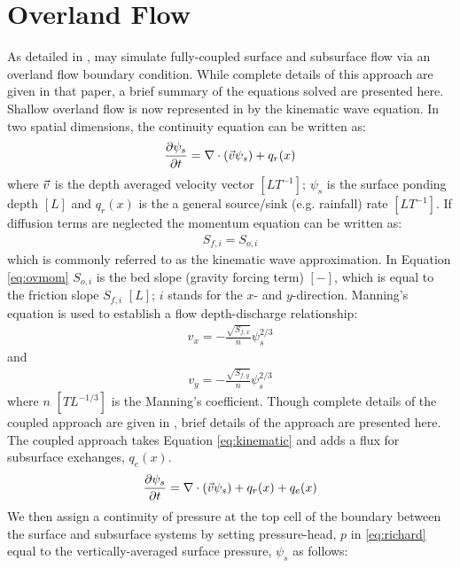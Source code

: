 \section{Overland Flow}
\label{Overland Flow}
As detailed in \cite{KM06}, \parflow{} may simulate fully-coupled surface and subsurface flow via an overland flow boundary condition.  While complete details of this approach are given in that paper, a brief summary of the equations solved are presented here.  Shallow overland flow is now represented in \parflow{} by the kinematic wave equation.   In two spatial dimensions, the continuity equation can be written as:
\begin{eqnarray}
\frac{\partial \psi_s}{\partial t} =
\nabla \cdot ({\vec v}\psi_s) + q_r(x)
\label{eq:kinematic}
\end{eqnarray}
where ${\vec v}$ is the depth averaged velocity vector $[LT^{-1}]$; $\psi_s$ is the surface ponding depth $[L]$ and $q_r(x)$ is the a general source/sink (e.g. rainfall) rate $[LT^{-1}]$. If diffusion terms are neglected the momentum equation can be written as:
\begin{eqnarray}
S_{f,i} = S_{o,i}
\label{eq:ovmom}
\end{eqnarray}
which is commonly referred to as the kinematic wave approximation. In Equation \ref{eq:ovmom} $S_{o,i}$ is the bed slope (gravity forcing term) $[-]$, which is equal to the friction slope $S_{f,i}$ $[L]$; $i$ stands for the $x$- and $y$-direction. Manning's equation is used to establish a flow depth-discharge relationship:
\begin{eqnarray}
v_x=- \frac{\sqrt{S_{f,x}}}{n}\psi_{s}^{2/3}
\label{eq:manningsx}
\end{eqnarray}
and
\begin{eqnarray}
v_y=- \frac{\sqrt{S_{f,y}}}{n}\psi_{s}^{2/3}
\label{eq:manningsy}
\end{eqnarray}
where $n$ $[TL^{-1/3}]$ is the Manning's coefficient.\newline
Though complete details of the coupled approach are given in \cite{KM06}, brief details of the approach are presented here.  The coupled approach takes Equation \ref{eq:kinematic} and adds a flux for subsurface exchanges, $q_e(x)$.
\begin{eqnarray}
\frac{\partial \psi_s}{\partial t} =
\nabla \cdot ({\vec v}\psi_s) + q_r(x) + q_e(x)
\label{eq:kinematic_ex}
\end{eqnarray}
We then assign a continuity of pressure at the top cell of the boundary between the surface and subsurface systems by setting pressure-head, $p$ in \ref{eq:richard} equal to the vertically-averaged surface pressure, $\psi_s$ as follows:
